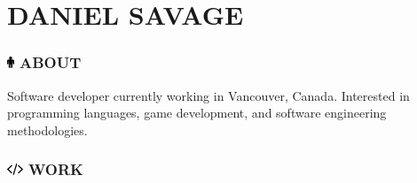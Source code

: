 \documentclass[10pt]{tccv}
\begin{document}
\part{DANIEL SAVAGE}

\flafamily

\section{\textcolor{black}{\includegraphics[height=10pt, keepaspectratio=true]{male}} ABOUT}

Software developer currently working in Vancouver, Canada. Interested in programming languages, game development, and software engineering methodologies.

\section{\includegraphics[height=10pt, keepaspectratio=true]{code} WORK}
\end{document}
